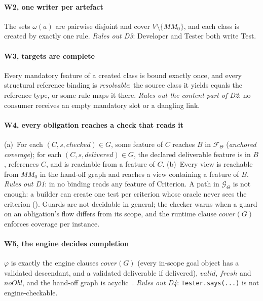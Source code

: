 \documentclass[10pt,conference]{IEEEtran}
\theoremstyle{definition}
\newcommand{\MM}{\mathit{MM}}
\newcommand{\Team}{\Theta}
\newcommand{\cls}[1]{\textsf{#1}}
\newcommand{\W}[1]{\textsf{W#1}}
\newcommand{\D}[1]{\textsf{D#1}}
\newcommand{\code}[1]{\texttt{#1}}
\begin{document}
\paragraph*{\W2, one writer per artefact} The sets $\omega(a)$ are pairwise
disjoint and cover $V\setminus\{\MM_0\}$, and each class is created by exactly
one rule. \emph{Rules out \D3}: Developer and Tester both write \cls{Test}.

\paragraph*{\W3, targets are complete} Every mandatory feature of a created
class is bound exactly once, and every structural reference binding is
\emph{resolvable}: the source class it yields equals the reference type, or
some rule maps it there. \emph{Rules out the content part of \D2}: no consumer
receives an empty mandatory slot or a dangling link.

\paragraph*{\W4, every obligation reaches a check that reads it} (a)~For each
$(C,s,\mathit{checked})\in G$, some feature of $C$ reaches $B$ in
$\mathcal{F}_\Team$ (\emph{anchored coverage}); for each
$(C,s,\mathit{delivered})\in G$, the declared deliverable feature is in $B$,
references $C$, and is reachable from a feature of $C$. (b)~Every view is
reachable from $\MM_0$ in the hand-off graph and reaches a view containing a
feature of $B$. \emph{Rules out \D1}: in  no binding reads
any feature of \cls{Criterion}. A path in $\mathcal{G}_\Team$ is not enough:
a builder can create one test per criterion whose oracle never sees the
criterion (). Guards are not decidable in general; the
checker warns when a guard on an obligation's flow differs from its scope,
and the runtime clause $\mathit{cover}(G)$ enforces coverage per instance.

\paragraph*{\W5, the engine decides completion} $\varphi$ is exactly the
engine clauses $\mathit{cover}(G)$ (every in-scope goal object has a
validated descendant, and a validated deliverable if delivered),
$\mathit{valid}$, $\mathit{fresh}$ and $\mathit{noObl}$, and the hand-off
graph is acyclic~\cite{klare2023termination}. \emph{Rules out \D4}:
\code{Tester.says(...)} is not engine-checkable.
\end{document}
